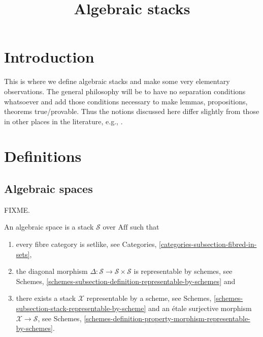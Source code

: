 

%


\title{Algebraic stacks}


\maketitle

\tableofcontents

\section{Introduction}
\label{section-introduction}

\noindent
This is where we define algebraic stacks and make some very elementary
observations. The general philosophy will be to have no separation
conditions whatsoever and add those conditions necessary to make lemmas,
propositions, theorems true/provable. Thus the notions discussed here 
differ slightly from those in other places in the literature, e.g.,
\cite{LM-B}.

\section{Definitions}
\label{section-definitions}

\subsection{Algebraic spaces}
\label{subsection-algebraic-spaces}

\noindent
FIXME.

\begin{definition}
An algebraic space is a stack $\mathcal{S}$ over $\text{Aff}$ such that
\begin{enumerate}
\item every fibre category is setlike, see Categories,
\autoref{categories-subsection-fibred-in-sets}, 
\item the diagonal morphism
$\Delta : \mathcal{S} \to \mathcal{S}\times\mathcal{S}$
is representable by schemes, see Schemes,
\autoref{schemes-subsection-definition-representable-by-schemes} and
\item there exists a stack $\mathcal{X}$ representable by a scheme, see
Schemes, \autoref{schemes-subsection-stack-representable-by-scheme}
and an \'etale surjective morphism $\mathcal{X} \to \mathcal{S}$,
see Schemes,
\autoref{schemes-definition-property-morphism-representable-by-schemes}.
\end{enumerate}
\end{definition}

